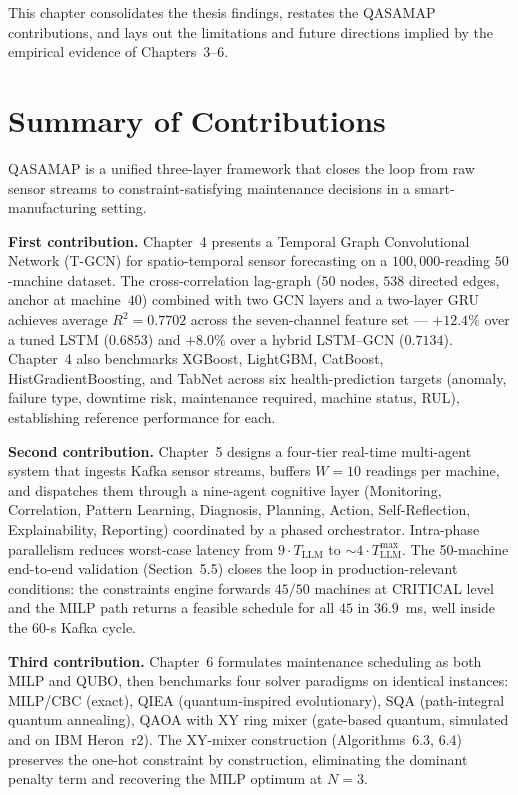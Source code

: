This chapter consolidates the thesis findings, restates the QASAMAP contributions, and lays out the limitations and future directions implied by the empirical evidence of Chapters~3--6.

\section{Summary of Contributions}

QASAMAP is a unified three-layer framework that closes the loop from raw sensor streams to constraint-satisfying maintenance decisions in a smart-manufacturing setting.

\textbf{First contribution.} Chapter~4 presents a Temporal Graph Convolutional Network (T-GCN) for spatio-temporal sensor forecasting on a $100{,}000$-reading $50$-machine dataset. The cross-correlation lag-graph ($50$ nodes, $538$ directed edges, anchor at machine~$40$) combined with two GCN layers and a two-layer GRU achieves average $R^2 = 0.7702$ across the seven-channel feature set --- $+12.4\%$ over a tuned LSTM ($0.6853$) and $+8.0\%$ over a hybrid LSTM--GCN ($0.7134$). Chapter~4 also benchmarks XGBoost, LightGBM, CatBoost, HistGradientBoosting, and TabNet across six health-prediction targets (anomaly, failure type, downtime risk, maintenance required, machine status, RUL), establishing reference performance for each.

\textbf{Second contribution.} Chapter~5 designs a four-tier real-time multi-agent system that ingests Kafka sensor streams, buffers $W=10$ readings per machine, and dispatches them through a nine-agent cognitive layer (Monitoring, Correlation, Pattern Learning, Diagnosis, Planning, Action, Self-Reflection, Explainability, Reporting) coordinated by a phased orchestrator. Intra-phase parallelism reduces worst-case latency from $9 \cdot T_{\text{LLM}}$ to $\sim 4 \cdot T_{\text{LLM}}^{\max}$. The 50-machine end-to-end validation (Section~5.5) closes the loop in production-relevant conditions: the constraints engine forwards $45/50$ machines at CRITICAL level and the MILP path returns a feasible schedule for all $45$ in $36.9$~ms, well inside the $60$-s Kafka cycle.

\textbf{Third contribution.} Chapter~6 formulates maintenance scheduling as both MILP and QUBO, then benchmarks four solver paradigms on identical instances: MILP/CBC (exact), QIEA (quantum-inspired evolutionary), SQA (path-integral quantum annealing), QAOA with XY ring mixer (gate-based quantum, simulated and on IBM Heron~r2). The XY-mixer construction (Algorithms~6.3, 6.4) preserves the one-hot constraint by construction, eliminating the dominant penalty term and recovering the MILP optimum at $N=3$.


